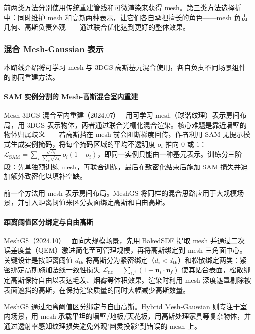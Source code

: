 前两类方法分别使用传统重建管线和可微渲染来获得 mesh。第三类方法选择折中：同时维护 mesh 和高斯两种表示，让它们各自承担擅长的角色——mesh 负责几何、高斯负责外观——通过联合优化达到更好的整体效果。

\subsubsection{混合 Mesh-Gaussian 表示}
\label{subsec:04_4_4}

本路线介绍将可学习 mesh 与 3DGS 高斯基元混合使用，各自负责不同场景组件的协同重建方法。

\paragraph{SAM 实例分割的 Mesh-高斯混合室内重建}

Mesh-3DGS 混合室内重建（2024.07）~\cite{2407_16173} 用可学习 mesh（球谐纹理）表示房间布局，用 3DGS 表示物体，两者通过联合光栅化混合渲染。核心难题是靠近墙壁的物体归属歧义——若高斯挡在 mesh 前会阻断梯度回传。作者利用 SAM 无提示模式生成实例掩码，将每个掩码区域的平均不透明度 $o_i$ 推向 $0$ 或 $1$：$\mathcal{L}_{\mathrm{SAM}} = \sum_i \frac{\sqrt{A_i}}{\sum_k \sqrt{A_k}}\, o_i(1 - o_i)$，即同一实例只能由一种基元表示。训练分三阶段：先单独预训练 mesh，再联合训练，最后在致密化结束后施加 SAM 损失并追加额外致密化以填补空缺。

前一个方法用 mesh 表示房间布局。MeshGS 将同样的混合思路应用于大规模场景，并引入距离阈值来区分表面绑定高斯和自由高斯。

\paragraph{距离阈值区分绑定与自由高斯}

MeshGS（2024.10）~\cite{2410_08941} 面向大规模场景，先用 BakedSDF 提取 mesh 并通过二次误差度量（QEM）激进简化至可管理规模，再将高斯绑定到 mesh 三角面中心。关键设计是按距离阈值 $d_{\mathrm{th}}$ 将高斯分为紧密绑定（$d_i < d_{\mathrm{th}}$）和松散绑定两类：紧密绑定高斯施加法线一致性损失 $\mathcal{L}_{\mathrm{nc}} = \sum_{G^t}(1 - \mathbf{n}_i \cdot \mathbf{n}_f)$ 使其贴合表面，松散绑定高斯保持自由以表达毛发、烟雾等体积效果。渲染时利用 mesh 深度遮罩剔除被表面遮挡的高斯，在保持渲染质量的同时大幅减少高斯数量。

MeshGS 通过距离阈值区分绑定与自由高斯。Hybrid Mesh-Gaussian 则专注于室内场景，用 mesh 承载平坦的墙壁/地板/天花板，用高斯处理家具等复杂物体，并通过透射率感知纹理损失避免外观"幽灵投影"到错误的 mesh 上。


